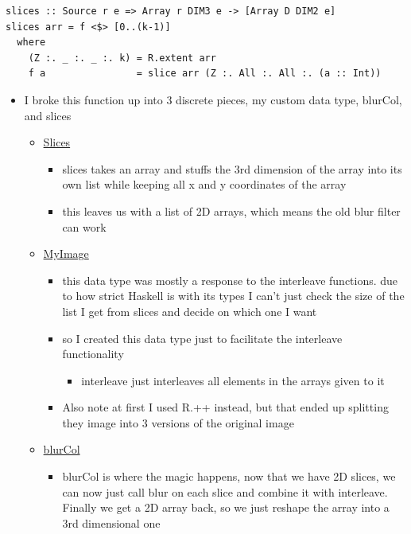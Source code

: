 \documentclass{article}
\begin{document}
\begin{enumerate}
\begin{enumerate}
\begin{itemize}
\begin{verbatim}
slices :: Source r e => Array r DIM3 e -> [Array D DIM2 e]
slices arr = f <$> [0..(k-1)]
  where
    (Z :. _ :. _ :. k) = R.extent arr
    f a                = slice arr (Z :. All :. All :. (a :: Int))
\end{verbatim}
\begin{itemize}
\item I broke this function up into 3 discrete pieces, my custom data
type, blurCol, and slices

\begin{itemize}
\item \uline{Slices}
\begin{itemize}
\item slices takes an array and stuffs the 3rd dimension of the array
into its own list while keeping all x and y coordinates of the array
\item this leaves us with a list of 2D arrays, which means the old
blur filter can work
\end{itemize}
\item \uline{MyImage}
\begin{itemize}
\item this data type was mostly a response to the interleave
functions. due to how strict Haskell is with its types Ι can't
just check the size of the list I get from slices and decide on
which one I want
\item so I created this data type just to facilitate the interleave
functionality
\begin{itemize}
\item interleave just interleaves all elements in the arrays given
to it
\end{itemize}
\item Also note at first I used R.++ instead, but that ended up
splitting they image into 3 versions of the original image
\end{itemize}
\item \uline{blurCol}
\begin{itemize}
\item blurCol is where the magic happens, now that we have 2D
slices, we can now just call blur on each slice and combine it
with interleave. Finally we get a 2D array back, so we just
reshape the array into a 3rd dimensional one
\end{itemize}
\end{itemize}
\end{itemize}


\end{itemize}
\end{enumerate}
\end{enumerate}
\end{document}
